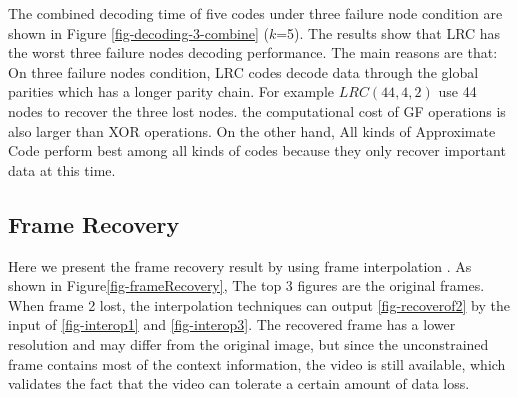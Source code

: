 \documentclass[sigconf]{acmart}
\begin{document}
The combined decoding time of five codes under three failure node condition are shown in Figure \ref{fig-decoding-3-combine} ($k$=5). The results show that LRC has the worst three failure nodes decoding performance. The main reasons are that: On three failure nodes condition, LRC codes decode data through the global parities which has a longer parity chain. For example $LRC (44,4,2)$ use 44 nodes to recover the three lost nodes. the computational cost of GF operations is also larger than XOR operations. On the other hand, All kinds of Approximate Code perform best among all kinds of codes because they only recover important data at this time.


\subsection{Frame Recovery}
Here we present the frame recovery result by using frame interpolation \cite{meyer2015phase, niklaus2018context,van2017frame}. As shown in Figure\ref{fig-frameRecovery}, The top 3 figures are the original frames. When frame 2 lost, the interpolation techniques can output \ref{fig-recoverof2} by the input of \ref{fig-interop1} and \ref{fig-interop3}. The recovered frame has a lower resolution and may differ from the original image, but since the unconstrained frame contains most of the context information, the video is still available, which validates the fact that the video can tolerate a certain amount of data loss.
\end{document}

